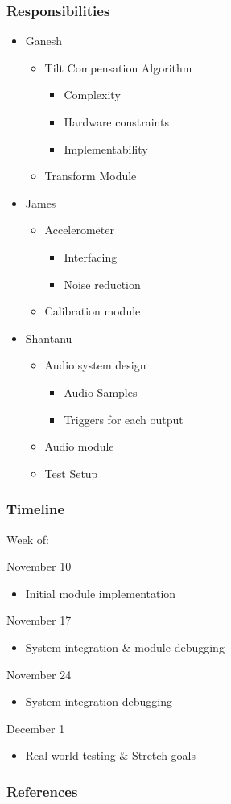 \documentclass{beamer}
\begin{document}
\begin{frame}
\frametitle{Responsibilities}
\begin{itemize}
	\item{Ganesh}
	\begin{itemize}
		\item Tilt Compensation Algorithm
		\begin{itemize}
			\item Complexity
			\item Hardware constraints
			\item Implementability
		\end{itemize}
		\item Transform Module
	\end{itemize}
	\item{James}
	\begin{itemize}
		\item Accelerometer
		\begin{itemize}
			\item Interfacing
			\item Noise reduction
		\end{itemize}
		\item Calibration module
	\end{itemize}
	\item{Shantanu}
	\begin{itemize}
		\item Audio system design
		\begin{itemize}
			\item Audio Samples
			\item Triggers for each output
		\end{itemize}
		\item Audio module
		\item Test Setup
	\end{itemize}
\end{itemize}
\end{frame}

\begin{frame}
\frametitle{Timeline}
Week of:
\begin{description}
	\item{November 10}
	\begin{itemize}
		\item Initial module implementation
	\end{itemize}
	\item{November 17}
	\begin{itemize}
		\item System integration \& module debugging
	\end{itemize}
	\item{November 24}
	\begin{itemize}
		\item System integration debugging
	\end{itemize}
	\item{December 1}
	\begin{itemize}
		\item Real-world testing \& Stretch goals
	\end{itemize}
\end{description}
\end{frame}

\begin{frame}
\frametitle{References}


\end{frame}
\end{document}
